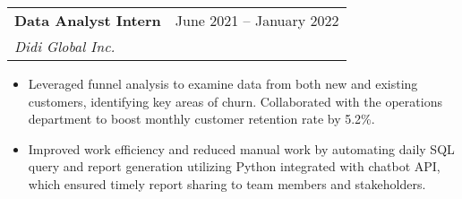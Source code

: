 \documentclass[letterpaper,11pt]{article}
\makeatletter
\newcommand{\resumeItem}[1]{
  \item\small{
    {#1 \vspace{-2pt}}
  }
}
\newcommand{\resumeSubheading}[4]{
  \vspace{-2pt}\item
    \begin{tabular*}{0.97\textwidth}[t]{l@{\extracolsep{\fill}}r}
      \textbf{#1} & #2 \\
      \textit{\small#3} & \textit{\small #4} \\
    \end{tabular*}\vspace{-7pt}
}
\newcommand{\resumeSubSubheading}[2]{
    \item
    \begin{tabular*}{0.97\textwidth}{l@{\extracolsep{\fill}}r}
      \textit{\small#1} & \textit{\small #2} \\
    \end{tabular*}\vspace{-7pt}
}
\newcommand{\resumeSubHeadingListEnd}{\end{itemize}}
\newcommand{\resumeItemListStart}{\begin{itemize}}
\newcommand{\resumeItemListEnd}{\end{itemize}\vspace{-5pt}}
\makeatother
\begin{document}
    \resumeSubheading
      {Data Analyst Intern}{June 2021 -- January 2022}
      {Didi Global Inc.}{}
      \resumeItemListStart

        \resumeItem{Leveraged funnel analysis to examine data from both new and existing customers, identifying key areas of churn. Collaborated with the operations department to boost monthly customer retention rate by 5.2\%.}
        \resumeItem{Improved work efficiency and reduced manual work by automating daily SQL query and report generation utilizing Python integrated with chatbot API, which ensured timely report sharing to team members and stakeholders.}
      \resumeItemListEnd
      

\end{document}
